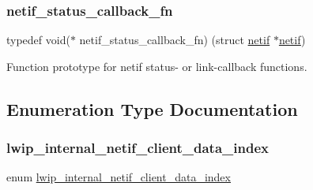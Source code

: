 \subsubsection{\texorpdfstring{netif\+\_\+status\+\_\+callback\+\_\+fn}{netif\_status\_callback\_fn}}
{\footnotesize\ttfamily typedef void($\ast$ netif\+\_\+status\+\_\+callback\+\_\+fn) (struct \hyperlink{structnetif}{netif} $\ast$\hyperlink{structnetif}{netif})}

Function prototype for netif status-\/ or link-\/callback functions. 

\subsection{Enumeration Type Documentation}
\mbox{\label{openmote-cc2538_2lwip_2src_2include_2lwip_2netif_8h_a528ae27498af778f808a930469d98308}} 
\subsubsection{\texorpdfstring{lwip\+\_\+internal\+\_\+netif\+\_\+client\+\_\+data\+\_\+index}{lwip\_internal\_netif\_client\_data\_index}}
{\footnotesize\ttfamily enum \hyperlink{native_2lwip_2src_2include_2lwip_2netif_8h_a528ae27498af778f808a930469d98308}{lwip\+\_\+internal\+\_\+netif\+\_\+client\+\_\+data\+\_\+index}}

